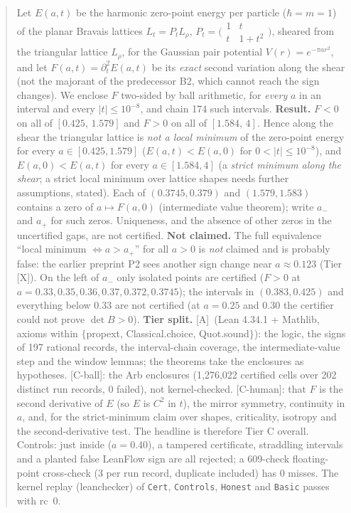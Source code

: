\documentclass[10pt]{article}
\newcommand{\tier}[1]{\textsf{[#1]}}
\newcommand{\tA}{\tier{A}}
\newcommand{\tX}{\tier{X}}
\newcommand{\tCh}{\tier{C-human}}
\newcommand{\tCb}{\textcolor{blue!60!black}{\textsf{[C-ball]}}}
\newcommand{\lean}[1]{\texttt{#1}}
\renewcommand{\_}{\textunderscore\penalty0\hspace{0pt}}
\begin{document}
\begin{abstract}
Let $E(a,t)$ be the harmonic zero-point energy per particle ($\hbar=m=1$) of the planar Bravais lattices $L_t=P_tL_\rho$,
$P_t=\bigl(\begin{smallmatrix}1&t\\t&1+t^2\end{smallmatrix}\bigr)$, sheared from the triangular lattice $L_\rho$, for the Gaussian pair
potential $V(r)=e^{-\pi a r^2}$, and let $F(a,t)=\partial_t^2E(a,t)$ be its \emph{exact} second variation along the shear
(not the majorant of the predecessor B2, which cannot reach the sign changes).
We enclose $F$ two-sided by ball arithmetic, for \emph{every} $a$ in an interval and every $|t|\le10^{-8}$, and chain 174 such intervals.
\textbf{Result.} $F<0$ on all of $[0.425,\,1.579]$ and $F>0$ on all of $[1.584,\,4]$. Hence along the shear the triangular lattice is
\emph{not a local minimum} of the zero-point energy for every $a\in[0.425,1.579]$ ($E(a,t)<E(a,0)$ for $0<|t|\le10^{-8}$), and
$E(a,0)<E(a,t)$ for every $a\in[1.584,4]$ (a \emph{strict minimum along the shear}; a strict local minimum over lattice shapes needs further
assumptions, stated). Each of $(0.3745,0.379)$ and $(1.579,1.583)$ contains a zero of $a\mapsto F(a,0)$ (intermediate value theorem); write $a_-$ and $a_+$ for such zeros.
Uniqueness, and the absence of other zeros in the uncertified gaps, are not certified.
\textbf{Not claimed.} The full equivalence ``local minimum $\iff a>a_+$'' for all $a>0$ is \emph{not} claimed and is probably false: the earlier
preprint P2 sees another sign change near $a\approx0.123$ (Tier \tX). On the left of $a_-$ only isolated points are certified
($F>0$ at $a=0.33,0.35,0.36,0.37,0.372,0.3745$); the intervals in $(0.383,0.425)$ and everything below $0.33$ are not certified (at $a=0.25$ and
$0.30$ the certifier could not prove $\det B>0$).
\textbf{Tier split.} \tA\ (Lean 4.34.1 + Mathlib, axioms within $\{$propext, Classical.choice, Quot.sound$\}$): the logic, the signs of 197
rational records, the interval-chain coverage, the intermediate-value step and the window lemmas; the theorems take the enclosures as hypotheses.
\tCb: the Arb enclosures (1{,}276{,}022 certified cells over 202 distinct run records, 0 failed), not kernel-checked. \tCh: that $F$ is the second derivative of $E$ (so $E$ is $C^2$ in $t$),
the mirror symmetry, continuity in $a$, and, for the strict-minimum claim over shapes, criticality, isotropy and the second-derivative test.
The headline is therefore Tier C overall. Controls: just inside ($a=0.40$), a tampered certificate, straddling intervals and a planted false LeanFlow sign are all rejected;
a 609-check floating-point cross-check (3 per run record, duplicate included) has 0 misses. The kernel replay (leanchecker) of \lean{Cert}, \lean{Controls}, \lean{Honest} and \lean{Basic} passes with rc~0.
\end{abstract}
\end{document}
